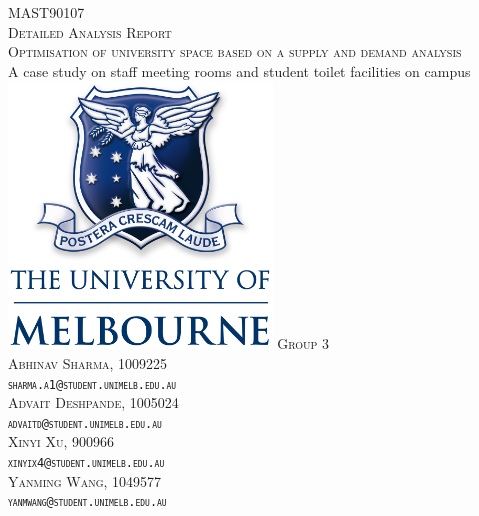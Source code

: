 \begin{titlepage}
\center %
 
\vfill
\textsc{\large{MAST90107} \\[1cm]
\large{Detailed Analysis Report} \\[0.2cm]\LARGE{Optimisation of university space based on a supply and demand analysis}}
\\
\large{A case study on staff meeting rooms and student toilet facilities on campus}
\vfill
\includegraphics[width=7cm]{resources/images/unimelblogo.png}
\vfill
\textsc{\LARGE{Group 3}}
\vspace{5mm}\\
\textsc{ Abhinav Sharma, 1009225\\
    \texttt{sharma.a1@student.unimelb.edu.au} }\\
    \vspace{5mm}
\textsc{ Advait Deshpande, 1005024\\
    \texttt{advaitd@student.unimelb.edu.au}}\\
    \vspace{5mm}
\textsc{ Xinyi Xu, 900966\\
    \texttt{xinyix4@student.unimelb.edu.au}}\\
    \vspace{5mm}
\textsc{ Yanming Wang, 1049577\\
    \texttt{yanmwang@student.unimelb.edu.au}}
\end{titlepage}